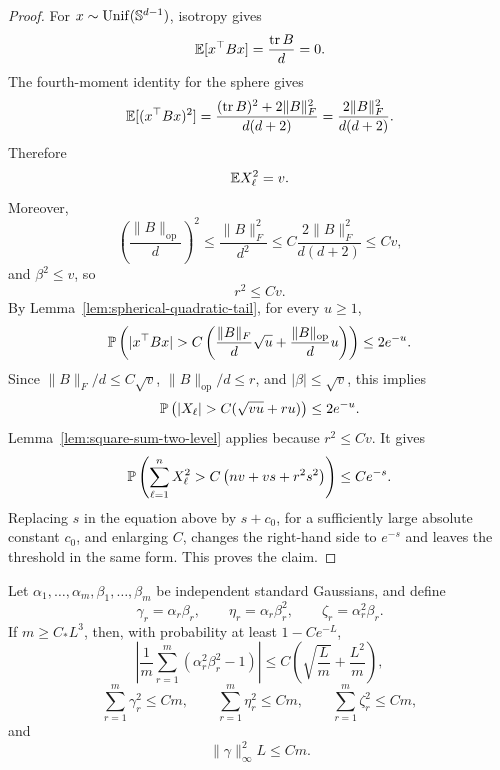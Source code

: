 \begin{proof}
For \(x\sim\mathrm{Unif}(\mathbb{S}^{d-1})\), isotropy gives
\[
\mathbb{E}[x^\top Bx]=\frac{\operatorname{tr}B}{d}=0.
\]
The fourth-moment identity for the sphere gives
\[
\mathbb{E}[(x^\top Bx)^2]
=
\frac{(\operatorname{tr}B)^2+2\|B\|_F^2}{d(d+2)}
=
\frac{2\|B\|_F^2}{d(d+2)}.
\]
Therefore
\[
\mathbb{E} X_\ell^2=v.
\]
Moreover,
\[
\left(\frac{\|B\|_{\mathrm{op}}}{d}\right)^2
\le
\frac{\|B\|_F^2}{d^2}
\le
C\frac{2\|B\|_F^2}{d(d+2)}
\le
Cv,
\]
and \(\beta^2\le v\), so
\[
r^2\le Cv.
\]
By Lemma~\ref{lem:spherical-quadratic-tail}, for every \(u\ge1\),
\[
\mathbb{P}\left(
|x^\top Bx|
>
C\left(
\frac{\|B\|_F}{d}\sqrt u+
\frac{\|B\|_{\mathrm{op}}}{d}u
\right)
\right)
\le 2e^{-u}.
\]
Since \(\|B\|_F/d\le C\sqrt v\), \(\|B\|_{\mathrm{op}}/d\le r\), and
\(|\beta|\le\sqrt v\), this implies
\[
\Pbb\left(
|X_\ell|>C(\sqrt{vu}+ru)
\right)
\le 2e^{-u}.
\]
Lemma~\ref{lem:square-sum-two-level} applies because \(r^2\le Cv\). It gives
\[
\mathbb{P}\left(
\sum_{\ell=1}^nX_\ell^2
>
C\left(nv+vs+r^2s^2\right)
\right)
\le Ce^{-s}.
\]
Replacing \(s\) in the equation above by \(s+c_0\), for a sufficiently large
absolute constant \(c_0\), and enlarging \(C\), changes the right-hand side to
\(e^{-s}\) and leaves the threshold in the same form. This proves the
claim.
\end{proof}

\begin{lemma}
\label{lem:scalar-weight-regularity}
Let \(\alpha_1,\dots,\alpha_m,\beta_1,\dots,\beta_m\) be independent standard
Gaussians, and define
\[
\gamma_r=\alpha_r\beta_r,
\qquad
\eta_r=\alpha_r\beta_r^2,
\qquad
\zeta_r=\alpha_r^2\beta_r.
\]
If \(m\ge C_*L^3\), then, with probability at least \(1-Ce^{-L}\),
\[
\left|
\frac1m\sum_{r=1}^m(\alpha_r^2\beta_r^2-1)
\right|
\le
C\left(\sqrt{\frac Lm}+\frac{L^2}{m}\right),
\]
\[
\sum_{r=1}^m\gamma_r^2\le Cm,
\qquad
\sum_{r=1}^m\eta_r^2\le Cm,
\qquad
\sum_{r=1}^m\zeta_r^2\le Cm,
\]
and
\[
\|\gamma\|_\infty^2L\le Cm.
\]
\end{lemma}


